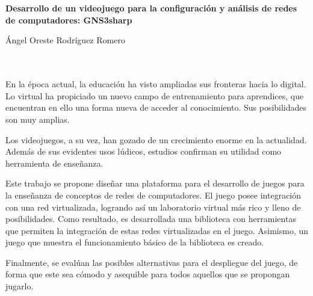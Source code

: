 \chapter*{}






\cleardoublepage
\thispagestyle{empty}

\begin{center}
{\large\bfseries Desarrollo de un videojuego para la configuración y análisis de redes de computadores: GNS3sharp}\\
\end{center}
\begin{center}
Ángel Oreste Rodríguez Romero\\
\end{center}

\\

\vspace{0.7cm}
\\

En la época actual, la educación ha visto ampliadas sus fronteras hacia lo digital. Lo virtual ha propiciado un nuevo campo de entrenamiento para aprendices, que encuentran en ello una forma nueva de acceder al conocimiento. Sus posibilidades son muy amplias.

Los videojuegos, a su vez, han gozado de un crecimiento enorme en la actualidad. Además de sus evidentes usos lúdicos, estudios confirman su utilidad como herramienta de enseñanza.

Este trabajo se propone diseñar una plataforma para el desarrollo de juegos para la enseñanza de conceptos de redes de computadores. El juego posee integración con una red virtualizada, logrando así un laboratorio virtual más rico y lleno de posibilidades. Como resultado, es desarrollada una biblioteca con herramientas que permiten la integración de estas redes virtualizadas en el juego. Asimismo, un juego que muestra el funcionamiento básico de la biblioteca es creado.

Finalmente, se evalúan las posibles alternativas para el despliegue del juego, de forma que este sea cómodo y asequible para todos aquellos que se propongan jugarlo.


